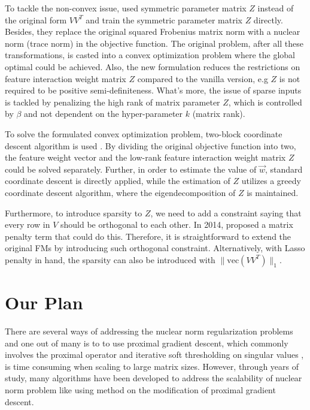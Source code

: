 \documentclass{article}
\newcommand{\vect}{\text{vec}}
\begin{document}
To tackle the non-convex issue, \cite{lu2} used symmetric parameter matrix $Z$ instead of the original  form $VV^T$ and train the symmetric parameter matrix $Z$ directly. Besides, they replace the original squared Frobenius matrix norm with a nuclear norm (trace norm) in the objective function. The original problem, after all these transformations, is casted into a convex optimization problem where the global optimal could be achieved. Also, the new formulation reduces the restrictions on feature interaction weight matrix $Z$ compared to the vanilla version, e.g $Z$ is not required to be  positive semi-definiteness. What’s more, the issue of sparse inputs is tackled by penalizing the high rank of matrix parameter $Z$, which is controlled by $\beta$ and not dependent on the hyper-parameter $k$ (matrix rank).

To solve the formulated convex optimization problem, two-block coordinate descent algorithm is used \cite{lu2}. By dividing the original objective function into two, the feature weight vector and the low-rank feature interaction weight matrix $Z$ could be solved separately. Further, in order to estimate the value of $\vec{w}$, standard coordinate descent is directly applied, while the estimation of $Z$ utilizes a greedy coordinate descent algorithm, where the eigendecomposition of $Z$ is maintained.

Furthermore, to introduce sparsity to $Z$, we need to add a constraint saying that every row in $V$ should be orthogonal to each other. In 2014, \cite{vervier2014learning} proposed a matrix penalty term that could do this. Therefore, it is straightforward to extend the original FMs by introducing such orthogonal constraint. Alternatively, with Lasso penalty in hand, the sparsity can also be introduced with $\|\vect(VV^T)\|_1$. 
 
\section{Our Plan}

There are several ways of addressing the nuclear norm regularization problems and one out of many is to to use proximal gradient descent, which commonly involves the proximal operator and iterative soft thresholding on singular values \cite{lu3}, is time consuming when scaling to large matrix sizes. However, through years of study, many algorithms have been developed to address the scalability of nuclear norm problem like \cite{lu4} using method on the modification of proximal gradient descent.
\end{document}
